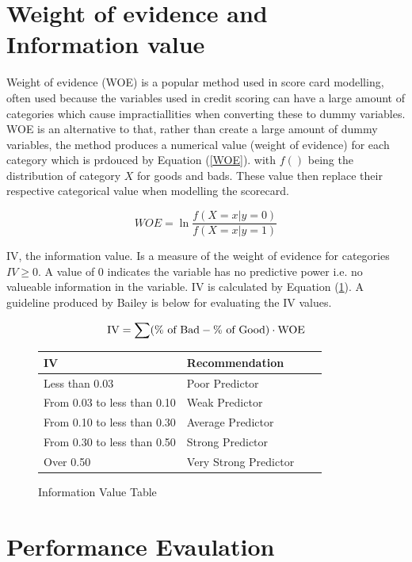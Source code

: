 \section{Weight of evidence and Information value}

Weight of evidence (WOE) is a popular method used in score card modelling, often used because the variables used in credit scoring can have a large amount of categories which cause impractiallities when converting these to dummy variables. WOE is an alternative to that, rather than create a large amount of dummy variables, the method produces a numerical value (weight of evidence) for each category which is prdouced by Equation (\ref{WOE}). with $f()$ being the distribution of category $X$ for goods and bads. These value then replace their respective categorical value when modelling the scorecard.

\begin{equation}\label{WOE}
WOE = \ln \frac{f(X=x|y=0)}{f(X=x|y=1)}
\end{equation}

IV, the information value. Is a measure of the weight of evidence for categories $IV \geq 0$. A value of 0 indicates the variable has no predictive power i.e. no valueable information in the variable. IV is calculated by Equation (\ref{IV}). A guideline produced by Bailey\cite{bailey2004credit} is below for evaluating the IV values.

\begin{equation}\label{IV}
\textup{IV} = \sum (\% \textup{ of Bad} - \% \textup{ of Good}) \cdot \textup{WOE}
\end{equation}

\begin{figure}[H]
	\centering
	\begin{tabular}{l l l l}
	IV	&Recommendation \\
	\hline
	Less than 0.03			&Poor Predictor \\
	From 0.03 to less than 0.10	&Weak Predictor \\
	From 0.10 to less than 0.30	&Average Predictor \\
	From 0.30 to less than 0.50	&Strong Predictor \\
	Over 0.50				&Very Strong Predictor \\
	\end{tabular}
	\caption{Information Value Table \label{IV}}\cite{bailey2004credit}
\end{figure}

\section{Performance Evaulation} \label{sec:perf_eval}

